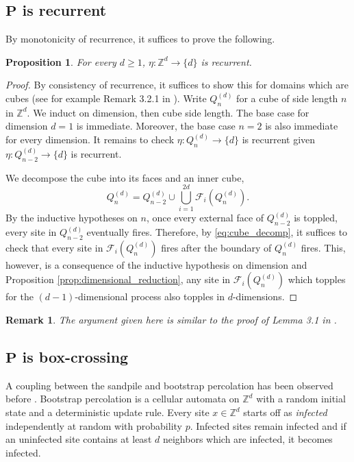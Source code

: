 \documentclass[aap]{imsart}
\newcommand{\Z}{\mathbb{Z}}
\newtheorem{prop}{Proposition}[section]
\newtheorem{remark}{Remark}
\begin{document}
\subsection{\texorpdfstring{$\mathbf{P}$}{P} is recurrent}
By monotonicity of recurrence, it suffices to prove the following. 
\begin{prop} \label{prop:recurrence}
	For every $d \geq 1$, $\eta:\Z^d \to \{d\}$ is recurrent.
\end{prop}
\begin{proof}
	By consistency of recurrence, it suffices to show this for domains which are cubes (see for example Remark 3.2.1 in \cite{redig2005mathematical}). Write $Q_n^{(d)}$ for a cube of side length $n$ in $\Z^d$.
	We induct on dimension, then cube side length. The base case for dimension $d = 1$ is immediate. 
	Moreover, the base case $n = 2$ is also immediate for every dimension.
	It remains to check $\eta: Q_n^{(d)} \to \{d\}$ is recurrent given $\eta: Q_{n-2}^{(d)} \to \{d\}$ is recurrent.
	
	We decompose the cube into its faces and an inner cube, 
	\begin{equation} \label{eq:cube_decomp}
	Q_{n}^{(d)} = Q_{n-2}^{(d)} \cup \bigcup_{i=1}^{2d} \mathcal{F}_i(Q_n^{(d)}).
	\end{equation}
	By the inductive hypotheses on $n$, once every external face of $Q_{n-2}^{(d)}$ is toppled, every site in $Q^{(d)}_{n-2}$ 
	eventually fires. Therefore, by \eqref{eq:cube_decomp}, it suffices to check that every site in  
	$\mathcal{F}_i(Q_n^{(d)})$ fires after the boundary of $Q_n^{(d)}$ fires.  This, however, is a consequence of the inductive hypothesis
	on dimension and Proposition \ref{prop:dimensional_reduction}, any site in $\mathcal{F}_i(Q_n^{(d)})$ which topples for the $(d-1)$-dimensional process also topples in $d$-dimensions.
	
\end{proof}
\begin{remark}
	The argument given here is similar to the proof of Lemma 3.1 in \cite{schonmann1992behavior}.
\end{remark}

\subsection{\texorpdfstring{$\mathbf{P}$}{P} is box-crossing}
A coupling between the sandpile and bootstrap percolation has been observed before  \cite{fey2010growth}. 
Bootstrap percolation is a cellular automata on $\Z^d$ with a random initial state and a deterministic update rule. 
Every site $x \in \Z^d$ starts off as {\it infected} independently at random with probability $p$. 
Infected sites remain infected and if an uninfected site contains at least $d$ neighbors which
are infected, it becomes infected.
\end{document}
